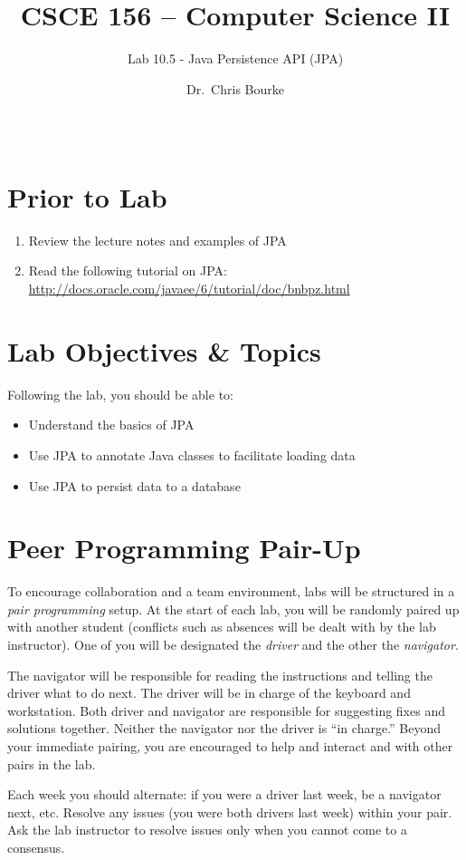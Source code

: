 \documentclass[12pt]{scrartcl}
\title{CSCE 156 -- Computer Science II}
\subtitle{Lab 10.5 - Java Persistence API (JPA)}
\author{Dr.\ Chris Bourke}
\date{~}
\begin{document}
\maketitle

\section*{Prior to Lab}

\begin{enumerate}
  \item Review the lecture notes and examples of JPA
  \item Read the following tutorial on JPA: \url{http://docs.oracle.com/javaee/6/tutorial/doc/bnbpz.html}
\end{enumerate}

\section*{Lab Objectives \& Topics}
Following the lab, you should be able to:
\begin{itemize}
  \item Understand the basics of JPA
  \item Use JPA to annotate Java classes to facilitate loading 
    data
  \item Use JPA to persist data to a database
\end{itemize}

\section*{Peer Programming Pair-Up}

To encourage collaboration and a team environment, labs will be
structured in a \emph{pair programming} setup.  At the start of
each lab, you will be randomly paired up with another student 
(conflicts such as absences will be dealt with by the lab instructor).
One of you will be designated the \emph{driver} and the other
the \emph{navigator}.  

The navigator will be responsible for reading the instructions and
telling the driver what to do next.  The driver will be in charge of the
keyboard and workstation.  Both driver and navigator are responsible
for suggesting fixes and solutions together.  Neither the navigator
nor the driver is ``in charge.''  Beyond your immediate pairing, you
are encouraged to help and interact and with other pairs in the lab.

Each week you should alternate: if you were a driver last week, 
be a navigator next, etc.  Resolve any issues (you were both drivers
last week) within your pair.  Ask the lab instructor to resolve issues
only when you cannot come to a consensus.  
\end{document}
